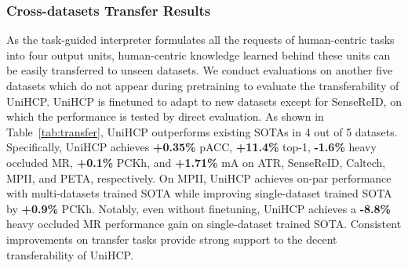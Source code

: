 \documentclass[10pt,twocolumn,letterpaper]{article}
\begin{document}
\subsubsection{Cross-datasets Transfer Results} \label{sec:transfer results}
As the task-guided interpreter formulates all the requests of human-centric tasks into four output units, human-centric knowledge learned behind these units can be easily transferred to unseen datasets. We conduct evaluations on another five datasets which do not appear during pretraining to evaluate the transferability of UniHCP. UniHCP is finetuned to adapt to new datasets except for SenseReID, on which the performance is tested by direct evaluation.
As shown in Table~\ref{tab:transfer}, UniHCP outperforms existing SOTAs in 4 out of 5 datasets. Specifically, UniHCP achieves \textbf{+0.35\%} pACC, \textbf{+11.4\%} top-1, \textbf{-1.6\%} heavy occluded MR, \textbf{+0.1\%} PCKh, and \textbf{+1.71\%} mA on ATR, SenseReID, Caltech, MPII, and PETA, respectively. On MPII, UniHCP achieves on-par performance with multi-datasets trained SOTA while improving single-dataset trained SOTA by \textbf{+0.9\%} PCKh. 
Notably, even without finetuning, UniHCP achieves a \textbf{-8.8\%} heavy occluded MR performance gain on single-dataset trained SOTA.
Consistent improvements on transfer tasks provide strong support
to the decent transferability of UniHCP.

\begin{table}[tbp]
  \centering
  \caption{Comparison of different parameter-sharing schemes. 
 We report the average scores of direct evaluation results on in-pretrain human-centric datasets.  ``by '' denotes sharing decoder and interpreter across task types .
For more detailed results on each dataset, please refer to the supplementary.}
  \label{tab:ablation}\vspace{-1em}
\end{table}
\end{document}
